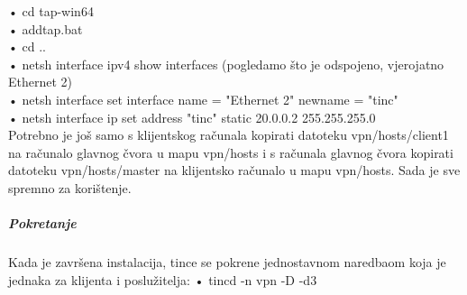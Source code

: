 \smallbreak •	cd tap-win64\\
\smallbreak •	addtap.bat\\
\smallbreak •	cd ..\\
\smallbreak •	netsh interface ipv4 show interfaces   (pogledamo što je odspojeno, vjerojatno Ethernet 2)\\
\smallbreak •	netsh interface set interface name = "Ethernet 2" newname = "tinc"\\
\smallbreak •	netsh interface ip set address "tinc" static 20.0.0.2 255.255.255.0\\
\FloatBarrier
Potrebno je još samo s klijentskog računala kopirati datoteku vpn/hosts/client1 na računalo glavnog čvora u mapu vpn/hosts
i s računala glavnog čvora kopirati datoteku vpn/hosts/master na klijentsko računalo u mapu vpn/hosts. Sada je sve spremno za korištenje.

\subparagraph{Pokretanje}
\hfill \smallbreak
Kada je završena instalacija, tince se pokrene jednostavnom naredbaom koja je jednaka za klijenta i poslužitelja:
\FloatBarrier
\smallbreak •	tincd -n vpn -D -d3